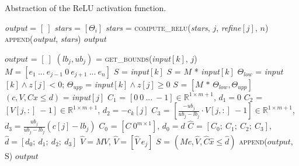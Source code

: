 \begin{algorithm}[t!]
  \caption{Abstraction of the ReLU activation function.}
  \label{alg:relu-abst}
  \small
  \begin{algorithmic}[1]
    \State \emph{output} = $[\:]$
      \State \emph{stars} = $[\Theta_i]$
        \emph{stars} = \textsc{compute\_relu}(\emph{stars}, $j$,
        \emph{refine}$[j]$, $n$)
      \EndFor
      \State \textsc{append}(\emph{output}, \emph{stars})
    \EndFor
    \State \Return \emph{output}
    \EndFunction
  \item[]
    \State $output$ = $[\: ]$
      \State $(lb_j, ub_j)$ = \textsc{get\_bounds}(\emph{input}$[k]$, $j$)
      \State $M = [e_1\ ...\ e_{j-1}\ 0\ e_{j+1}\ ...\ e_n]$
       $S$ = \emph{input}$[k]$
       $S$ = $M$ * \emph{input}$[k]$
      \Else
          \State $\Theta_{low}$ = \emph{input}$[k] \wedge z[j] < 0$;
          \hspace{1ex}$\Theta_{upp}$ = \emph{input}$[k] \wedge z[j] \geq 0$
          \State $S$ = $[M \mbox{ * } \Theta_{low}, \Theta_{upp}]$
        \Else
          \State $(c,V,Cx \leq d)$ = \emph{input}$[j]$
          \State $C_1$ = $[0\ 0\ ...\ -1] \in \mathbb{R}^{1 \times m+1}$, $d_1 = 0$
          \State $C_2$ = $[V[j,:]\ -1] \in \mathbb{R}^{1 \times m+1}$, $d_2 = -c_k[j]$
          \State $C_3$ = $[\frac{-ub_j}{ub_j - lb_j} \cdot V[j,:]\ -1] \in \mathbb{R}^{1 \times m+1}$, $d_3 = \frac{ub_j}{ub_j - lb_j} (c[j] - lb_j)$
          \State $C_0$ = $[C\ 0^{m \times 1}]$, $d_0 = d$
          \State $\hat{C}$ = $[C_0;\ C_1;\ C_2;\ C_3]$, $\hat{d} = [d_0;\ d_1;\ d_2;\ d_3]$
          \State $\hat{V} = MV$, $\hat{V} = [\hat{V}\ e_j]$
          \State $S$ = $(Mc, \hat{V}, \hat{C} \hat{x} \leq \hat{d})$
        \EndIf
      \EndIf
      \State \textsc{append}($output$, S)
    \EndFor
    \State \Return $output$
    \EndFunction
  \end{algorithmic}
\end{algorithm}

